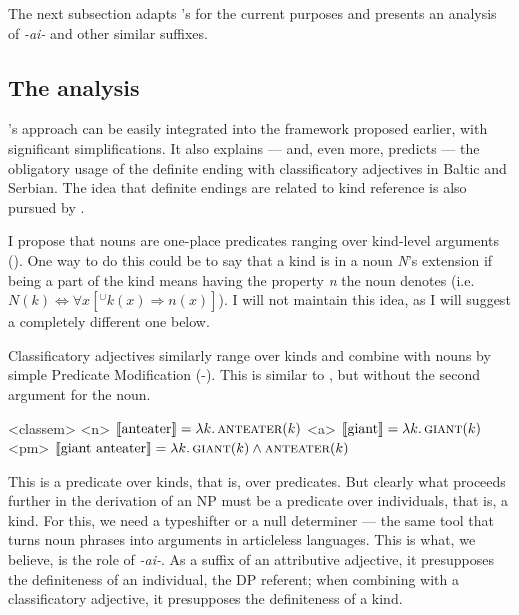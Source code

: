 \documentclass[a4paper, 12pt]{article}
\begin{document}
The next subsection adapts \textcite{mcnally2004relationaladjectivesproperties}'s for the current purposes and presents an analysis of \textit{-ai-} and other similar suffixes.

\subsection{The analysis}

's approach can be easily integrated into the framework proposed earlier, with significant simplifications. It also explains --- and, even more, predicts --- the obligatory usage of the definite ending with classificatory adjectives in Baltic and Serbian. The idea that definite endings are related to kind reference is also pursued by \parencite{sereikaite2017kindreferencedps}.

I propose that nouns are one-place predicates ranging over kind-level arguments (). One way to do this could be to say that a kind is in a noun \textit{N}'s extension if being a part of the kind means having the property \textit{n} the noun denotes (i.e. $N(k)\iff \forall x[^\cup k(x)\Rightarrow n(x)]$). I will not maintain this idea, as I will suggest a completely different one below.

Classificatory adjectives similarly range over kinds and combine with nouns by simple Predicate Modification (-). This is similar to , but without the second argument for the noun.

\pex<classem>
    \a<n> $\llbracket \text{anteater} \rrbracket = \lambda k.\,\textsc{anteater}(k)$
    \a<a> $\llbracket \text{giant} \rrbracket  = \lambda k.\,\textsc{giant}(k)$
    \a<pm> $\llbracket \text{giant anteater} \rrbracket = \lambda k.\,\textsc{giant}(k) \land \textsc{anteater}(k)$
\xe

This is a predicate over kinds, that is, over predicates. But clearly what proceeds further in the derivation of an NP must be a predicate over individuals, that is, a kind. For this, we need a typeshifter or a null determiner --- the same tool that turns noun phrases into arguments in articleless languages. This is what, we believe, is the role of \textit{-ai-}. As a suffix of an attributive adjective, it presupposes the definiteness of an individual, the DP referent; when combining  with a classificatory adjective, it presupposes the definiteness of a kind.
\end{document}

